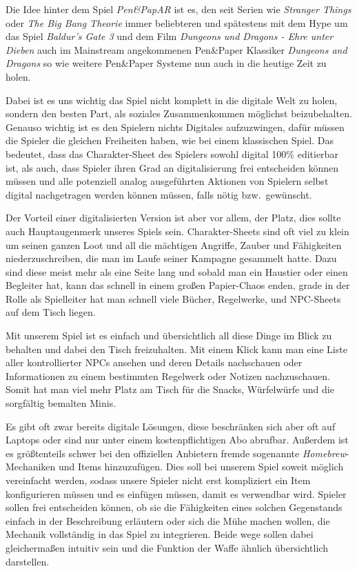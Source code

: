 Die Idee hinter dem Spiel \textit{Pen\&PapAR} ist es, den seit Serien wie
\textit{Stranger Things} oder \textit{The Big Bang Theorie} immer beliebteren und
spätestens mit dem Hype um das Spiel \textit{Baldur's Gate 3} und dem Film
\textit{Dungeons und Dragons - Ehre unter Dieben} auch im Mainstream angekommenen
Pen\&Paper Klassiker \textit{Dungeons and Dragons} so wie weitere Pen\&Paper Systeme nun
auch in die heutige Zeit zu holen.\newblock

Dabei ist es uns wichtig das Spiel nicht komplett in die digitale Welt zu holen, sondern
den besten Part, als soziales Zusammenkommen möglichst beizubehalten.
Genauso wichtig ist es den Spielern nichts Digitales aufzuzwingen, dafür müssen
die Spieler die gleichen Freiheiten haben, wie bei einem klassischen Spiel.
Das bedeutet, dass das Charakter-Sheet des Spielers sowohl digital 100\% editierbar ist,
als auch, dass Spieler ihren Grad an digitalisierung frei entscheiden können müssen und
alle potenziell analog ausgeführten Aktionen von Spielern selbst digital nachgetragen werden
können müssen, falls nötig bzw.\ gewünscht.\newblock

Der Vorteil einer digitalisierten Version ist aber vor allem, der Platz, dies sollte auch
Hauptaugenmerk unseres Spiels sein.
Charakter-Sheets sind oft viel zu klein um seinen ganzen Loot und all die mächtigen Angriffe,
Zauber und Fähigkeiten niederzuschreiben, die man im Laufe seiner Kampagne gesammelt hatte.
Dazu sind diese meist mehr als eine Seite lang und sobald man ein Haustier oder einen Begleiter
hat, kann das schnell in einem großen Papier-Chaos enden, grade in der Rolle als Spielleiter
hat man schnell viele Bücher, Regelwerke, und NPC-Sheets auf dem Tisch liegen.\n

Mit unserem Spiel ist es einfach und übersichtlich all diese Dinge im Blick zu behalten und
dabei den Tisch freizuhalten.
Mit einem Klick kann man eine Liste aller kontrollierter NPCs
ansehen und deren Details nachschauen oder Informationen zu einem bestimmten Regelwerk oder Notizen
nachzuschauen.
Somit hat man viel mehr Platz am Tisch für die Snacks, Würfelwürfe und die sorgfältig bemalten
Minis.\newblock

Es gibt oft zwar bereits digitale Lösungen, diese beschränken sich aber oft auf Laptops
oder sind nur unter einem kostenpflichtigen Abo abrufbar.
Außerdem ist es größtenteils schwer bei den offiziellen Anbietern fremde sogenannte \textit{Homebrew}-Mechaniken
und Items hinzuzufügen.
Dies soll bei unserem Spiel soweit möglich vereinfacht werden, sodass unsere Spieler nicht erst kompliziert
ein Item konfigurieren müssen und es einfügen müssen, damit es verwendbar wird.
Spieler sollen frei entscheiden können, ob sie die Fähigkeiten eines solchen Gegenstands einfach
in der Beschreibung erläutern oder sich die Mühe machen wollen, die Mechanik vollständig in das
Spiel zu integrieren.
Beide wege sollen dabei gleichermaßen intuitiv sein und die Funktion der Waffe ähnlich
übersichtlich darstellen.\newblock

